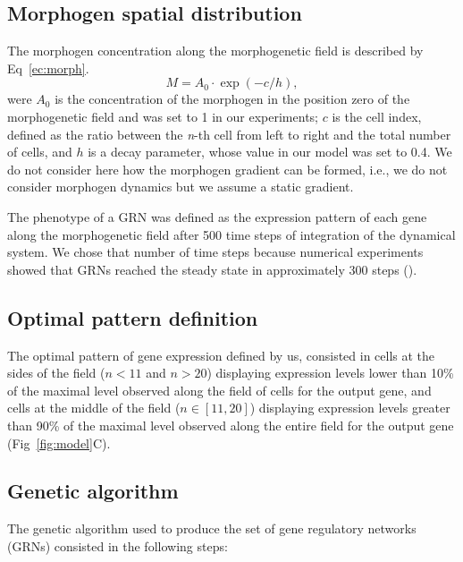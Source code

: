 \documentclass[10pt,letterpaper]{article}
\begin{document}
\subsection*{Morphogen spatial distribution}

The morphogen concentration along the morphogenetic field is described by
Eq~\ref{ec:morph}.
\begin{equation}
 M = A_0 \cdot \exp(-c/h),
 \label{ec:morph}
\end{equation}
\noindent
were $A_0$ is the concentration of the morphogen in the position zero of the
morphogenetic field and was set to 1 in our experiments; $c$ is the cell index,
defined as the ratio between the \emph{n}-th cell from left to right and the
total number of cells, and $h$ is a decay parameter, whose value in our model
was set to 0.4. We do not consider here how the morphogen gradient can be
formed, i.e., we do not consider morphogen dynamics but we assume a static
gradient.

The phenotype of a GRN was defined as the expression pattern of each gene along
the morphogenetic field after 500 time steps of integration of the dynamical
system. We chose that number of time steps because numerical experiments showed
that GRNs reached the steady state in approximately 300 steps ().

\subsection*{Optimal pattern definition}

The optimal pattern of gene expression defined by us, consisted in cells at the
sides of the field ($n<11$ and $n>20$) displaying expression levels lower than
10\% of the maximal level observed along the field of cells for the output gene,
and cells at the middle of the field ($n ∈ [11,20]$) displaying expression
levels greater than 90\% of the maximal level observed along the entire field
for the output gene (Fig~\ref{fig:model}C).

\subsection*{Genetic algorithm}

The genetic algorithm used to produce the set of gene regulatory networks (GRNs)
consisted in the following steps:
\end{document}
